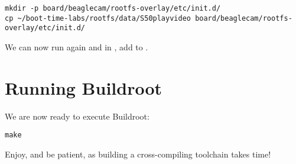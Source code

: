\begin{verbatim}
mkdir -p board/beaglecam/rootfs-overlay/etc/init.d/
cp ~/boot-time-labs/rootfs/data/S50playvideo board/beaglecam/rootfs-overlay/etc/init.d/
\end{verbatim}

We can now run  again and in , add  to
.

\section{Running Buildroot}

We are now ready to execute Buildroot:

\begin{verbatim}
make
\end{verbatim}

Enjoy, and be patient, as building a cross-compiling toolchain takes
time!
